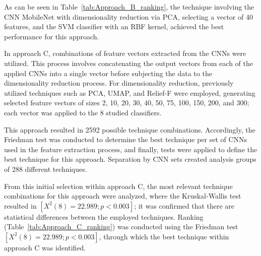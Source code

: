 \documentclass[preprint,12pt]{elsarticle}
\begin{document}
As can be seen in Table~\ref{tab:Approach_B_ranking}, the technique involving the CNN MobileNet with dimensionality reduction via PCA, selecting a vector of 40 features, and the SVM classifier with an RBF kernel, achieved the best performance for this approach.

In approach C, combinations of feature vectors extracted from the CNNs were utilized. This process involves concatenating the output vectors from each of the applied CNNs into a single vector before subjecting the data to the dimensionality reduction process. For dimensionality reduction, previously utilized techniques such as PCA, UMAP, and Relief-F were employed, generating selected feature vectors of sizes 2, 10, 20, 30, 40, 50, 75, 100, 150, 200, and 300; each vector was applied to the 8 studied classifiers.

This approach resulted in 2592 possible technique combinations. Accordingly, the Friedman test was conducted to determine the best technique per set of CNNs used in the feature extraction process, and finally, tests were applied to define the best technique for this approach. Separation by CNN sets created analysis groups of 288 different techniques.

From this initial selection within approach C, the most relevant technique combinations for this approach were analyzed, where the Kruskal-Wallis test resulted in $[X^2(8)=22.989; p<0.003]$; it was confirmed that there are statistical differences between the employed techniques. Ranking (Table~\ref{tab:Approach_C_ranking}) was conducted using the Friedman test $[X^2(8)=22.989; p<0.003]$, through which the best technique within approach C was identified.
\end{document}
